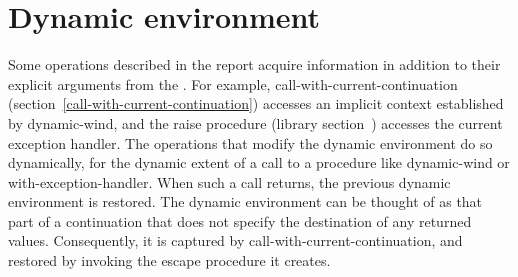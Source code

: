 \section{Dynamic environment}
\label{dynamicenvironmentsection}

Some operations described in the report acquire information in
addition to their explicit arguments from the .  For example, {\cf call-with-current-continuation}
(section~\ref{call-with-current-continuation}) accesses an implicit
context established by {\cf dynamic-wind}, and the {\cf raise}
procedure (library section~) accesses the
current exception handler.  The operations that modify the dynamic
environment do so dynamically, for the dynamic extent of a call to a
procedure like {\cf dynamic-wind} or {\cf with-exception-handler}.
When such a call returns, the previous dynamic environment is
restored.  The dynamic environment can be thought of as that part of a
continuation that does not specify the destination of any returned
values.  Consequently, it is captured by {\cf
  call-with-current-continuation}, and restored by invoking the escape
procedure it creates.

